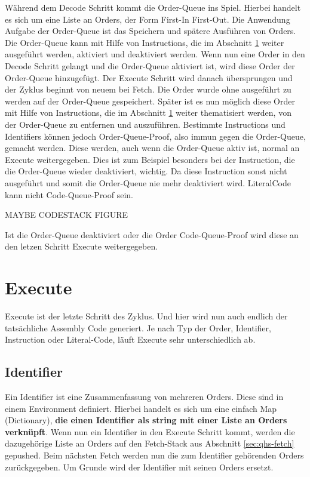 Während dem Decode Schritt kommt die Order-Queue ins Spiel. Hierbei handelt es sich um eine Liste an Orders, der Form First-In First-Out. Die Anwendung Aufgabe der Order-Queue ist das Speichern und spätere Ausführen von Orders.
Die Order-Queue kann mit Hilfe von Instructions, die im Abschnitt \ref{sec:qhs-execute} weiter ausgeführt werden, aktiviert und deaktiviert werden. Wenn nun eine Order in den Decode Schritt gelangt und die Order-Queue aktiviert ist,
wird diese Order der Order-Queue hinzugefügt. Der Execute Schritt wird danach übersprungen und der Zyklus beginnt von neuem bei Fetch. Die Order wurde ohne ausgeführt zu werden auf der Order-Queue gespeichert.
Später ist es nun möglich diese Order mit Hilfe von Instructions, die im Abschnitt \ref{sec:qhs-execute} weiter thematisiert werden, von der Order-Queue zu entfernen und auszuführen.
Bestimmte Instructions und Identifiers können jedoch Order-Queue-Proof, also immun gegen die Order-Queue, gemacht werden. Diese werden, auch wenn die Order-Queue aktiv ist, normal an Execute weitergegeben.
Dies ist zum Beispiel besonders bei der Instruction, die die Order-Queue wieder deaktiviert, wichtig. Da diese Instruction sonst nicht ausgeführt und somit die Order-Queue nie mehr deaktiviert wird.
LiteralCode kann nicht Code-Queue-Proof sein.

MAYBE CODESTACK FIGURE

Ist die Order-Queue deaktiviert oder die Order Code-Queue-Proof wird diese an den letzen Schritt Execute weitergegeben.

\section{Execute} \label{sec:qhs-execute}
Execute ist der letzte Schritt des Zyklus. Und hier wird nun auch endlich der tatsächliche Assembly Code generiert. Je nach Typ der Order, Identifier, Instruction oder Literal-Code, läuft Execute sehr unterschiedlich ab.

\subsection{Identifier}
Ein Identifier ist eine Zusammenfassung von mehreren Orders. Diese sind in einem Environment definiert. Hierbei handelt es sich um eine einfach Map (Dictionary), \textbf{die einen Identifier als string mit einer Liste an Orders verknüpft}.
Wenn nun ein Identifier in den Execute Schritt kommt, werden die dazugehörige Liste an Orders auf den Fetch-Stack aus Abschnitt \ref{sec:qhs-fetch} gepushed.
Beim nächsten Fetch werden nun die zum Identifier gehörenden Orders zurückgegeben. Um Grunde wird der Identifier mit seinen Orders ersetzt.

